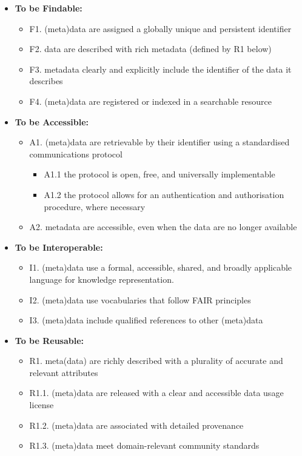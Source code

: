 \begin{itemize}
    \item \textbf{To be Findable:}
    \begin{itemize}
        \item F1. (meta)data are assigned a globally unique and persistent identifier
        \item F2. data are described with rich metadata (defined by R1 below)
        \item F3. metadata clearly and explicitly include the identifier of the data it describes
        \item F4. (meta)data are registered or indexed in a searchable resource
    \end{itemize}
    \item \textbf{To be Accessible:}
    \begin{itemize}
        \item A1. (meta)data are retrievable by their identifier using a standardised communications protocol
        \begin{itemize}
            \item A1.1 the protocol is open, free, and universally implementable
            \item A1.2 the protocol allows for an authentication and authorisation procedure, where necessary
        \end{itemize}
        \item A2. metadata are accessible, even when the data are no longer available
    \end{itemize}
    \item \textbf{To be Interoperable:}
    \begin{itemize}
        \item I1. (meta)data use a formal, accessible, shared, and broadly applicable language for knowledge representation.
        \item I2. (meta)data use vocabularies that follow FAIR principles
        \item I3. (meta)data include qualified references to other (meta)data
    \end{itemize}
    \item \textbf{To be Reusable:}
    \begin{itemize}
        \item R1. meta(data) are richly described with a plurality of accurate and relevant attributes
        \item R1.1. (meta)data are released with a clear and accessible data usage license
        \item R1.2. (meta)data are associated with detailed provenance
        \item R1.3. (meta)data meet domain-relevant community standards
    \end{itemize}
\end{itemize}

